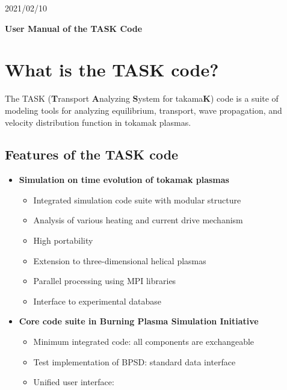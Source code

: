 \documentclass[11pt]{article}
\begin{document}
\begin{flushright}
2021/02/10
\end{flushright}

\begin{center}
\textbf{\Large User Manual of the TASK Code}
\end{center}

\tableofcontents

\section{What is the TASK code?}

The TASK (\textbf{T}ransport \textbf{A}nalyzing \textbf{S}ystem for
takama\textbf{K}) code is a suite of modeling tools for analyzing equilibrium,
transport, wave propagation, and velocity distribution function in
tokamak plasmas.

\subsection{Features of the TASK code}
\begin{itemize}
\item
\textbf{Simulation on time evolution of tokamak plasmas}
\begin{itemize}
\item
Integrated simulation code suite with modular structure
\item
Analysis of various heating and current drive mechanism
\item
High portability
\item
Extension to three-dimensional helical plasmas
\item
Parallel processing using MPI libraries
\item
Interface to experimental database
\end{itemize}
\item
\textbf{Core code suite in Burning Plasma Simulation Initiative}
\begin{itemize}
\item
Minimum integrated code: all components are exchangeable
\item
Test implementation of BPSD: standard data interface
\item
Unified user interface: 
\end{itemize}
\end{itemize}
\end{document}
